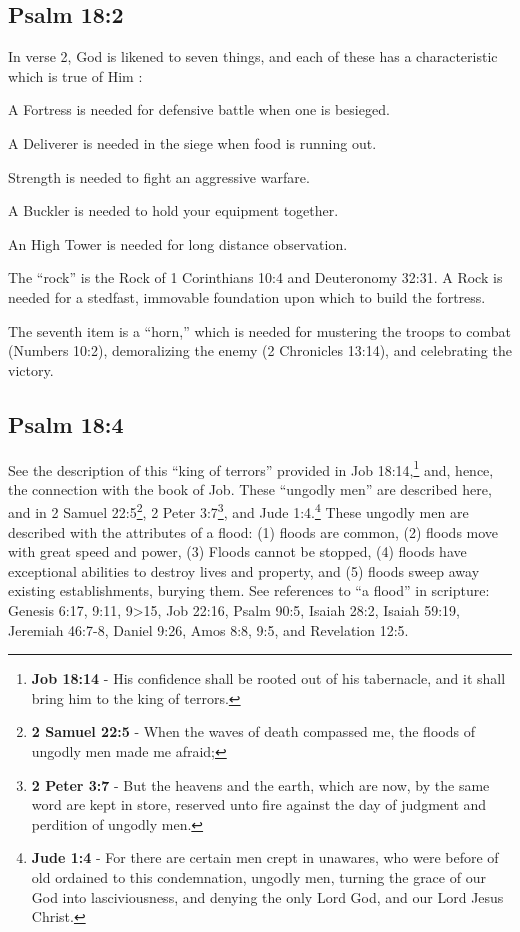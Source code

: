 \subsection{Psalm 18:2}
In verse 2, God is likened to seven things, and each of these has a characteristic which is true of Him \cite{Ruckman1992PsalmsV1}:
\begin{compactenum}
\item A Fortress is needed for defensive battle when one is besieged. 
\item A Deliverer is needed in the siege when food is running out.
\item Strength is needed to fight an aggressive warfare.
\item A Buckler is needed to hold your equipment together. 
\item An High Tower is needed for long distance observation.
\item The ``rock'' is the Rock of 1 Corinthians 10:4 and Deuteronomy 32:31. A Rock is needed for a stedfast, immovable foundation upon which to build the fortress. 
\item The seventh item is a ``horn,'' which is needed for mustering the troops to combat (Numbers 10:2), demoralizing the enemy (2 Chronicles 13:14), and celebrating the victory.
\end{compactenum}

\subsection{Psalm 18:4}
See the description of this ``king of terrors'' provided in Job 18:14,\footnote{\textbf{Job 18:14} - His confidence shall be rooted out of his tabernacle, and it shall bring him to the king of terrors.} and, hence, the connection with the book of Job. These ``ungodly men'' are described here, and in 2 Samuel 22:5\footnote{\textbf{2 Samuel 22:5} - When the waves of death compassed me, the floods of ungodly men made me afraid;}, 2 Peter 3:7\footnote{\textbf{2 Peter 3:7} - But the heavens and the earth, which are now, by the same word are kept in store, reserved unto fire against the day of judgment and perdition of ungodly men.}, and Jude 1:4.\footnote{\textbf{Jude 1:4} - For there are certain men crept in unawares, who were before of old ordained to this condemnation, ungodly men, turning the grace of our God into lasciviousness, and denying the only Lord God, and our Lord Jesus Christ.} These ungodly men are described with the attributes of a flood: (1) floods are common, (2) floods move with great speed and power, (3) Floods cannot be stopped, (4) floods have exceptional abilities to destroy lives and property, and (5) floods sweep away existing establishments, burying them. See references to ``a flood'' in scripture: Genesis 6:17, 9:11, 9>15, Job 22:16, Psalm 90:5, Isaiah 28:2, Isaiah 59:19, Jeremiah 46:7-8, Daniel 9:26, Amos 8:8, 9:5, and Revelation 12:5.

